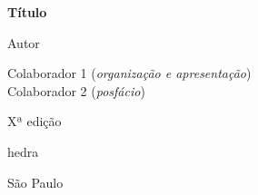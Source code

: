




\begingroup\thispagestyle{empty}\vspace*{.05\textheight} 

            {\formular
              \huge
              \noindent
              \textbf{Título}\\
              
              \vspace{-0.5cm}
              
              }
             
                 \vspace{1cm}
              
              {\formular\Large
              \noindent{}Autor
              }

              \vfill              

              {\small
              \noindent{}Colaborador 1 (\textit{organização e
              apresentação})\vspace{0.2cm}\\
              \noindent{}Colaborador 2 (\textit{posfácio})
              }

              \vspace{0.5cm}

              {\small\noindent{}Xª edição}

              \vfill

              \newfontfamily{}
              {\noindent\fontsize{30}{40}\selectfont \timesnewroman hedra}

              {\selectfont\small\noindent São Paulo \quad\the\year}

\endgroup
\pagebreak
